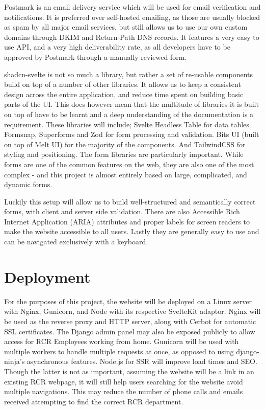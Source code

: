 Postmark is an email delivery service which will be used for email verification and notifications. It is preferred over self-hosted emailing, as those are usually blocked as spam by all major email services, but still allows us to use our own custom domains through DKIM and Return-Path DNS records. It features a very easy to use API, and a very high deliverability rate, as all developers have to be approved by Postmark through a manually reviewed form.

shadcn-svelte is not so much a library, but rather a set of re-usable components build on top of a number of other libraries. It allows us to keep a consistent design across the entire application, and reduce time spent on building basic parts of the UI. This does however mean that the multitude of libraries it is built on top of have to be learnt and a deep understanding of the documentation is a requirement. These libraries will include; Svelte Headless Table for data tables. Formsnap, Superforms and Zod for form processing and validation. Bits UI (built on top of Melt UI) for the majority of the components. And TailwindCSS for styling and positioning. The form libraries are particularly important. While forms are one of the common features on the web, they are also one of the most complex - and this project is almost entirely based on large, complicated, and dynamic forms.

Luckily this setup will allow us to build well-structured and semantically correct forms, with client and server side validation. There are also Accessible Rich Internet Application (ARIA) attributes and proper labels for screen readers to make the website accessible to all users. Lastly they are generally easy to use and can be navigated exclusively with a keyboard. 

\section{Deployment}
For the purposes of this project, the website will be deployed on a Linux server with Nginx, Gunicorn, and Node with its respective SvelteKit adaptor. Nginx will be used as the reverse proxy and HTTP server, along with Cerbot for automatic SSL certificates. The Django admin panel may also be exposed publicly to allow access for RCR Employees working from home. Gunicorn will be used with multiple workers to handle multiple requests at once, as opposed to using django-ninja's asynchronous features. Node.js for SSR will improve load times and SEO. Though the latter is not as important, assuming the website will be a link in an existing RCR webpage, it will still help users searching for the website avoid multiple navigations. This may reduce the number of phone calls and emails received attempting to find the correct RCR department.


